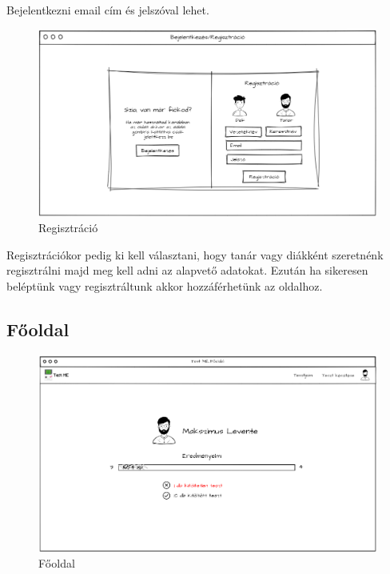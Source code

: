 Bejelentkezni  email cím és jelszóval lehet.

\begin{figure}[H]
    \centering
    \includegraphics[width=\linewidth]{images/signin_wireframe.png}
    \caption{Regisztráció}
    \label{fig:signin_wireframe}
\end{figure}

Regisztrációkor  pedig ki kell választani, hogy tanár vagy diákként szeretnénk regisztrálni majd meg kell adni az alapvető adatokat.
Ezután ha sikeresen beléptünk vagy regisztráltunk akkor hozzáférhetünk az oldalhoz.

\subsection{Főoldal}

\begin{figure}[H]
    \centering
    \includegraphics[width=\linewidth]{images/main_login_wireframe.png}
    \caption{Főoldal}
    \label{fig:main_page}
\end{figure}

